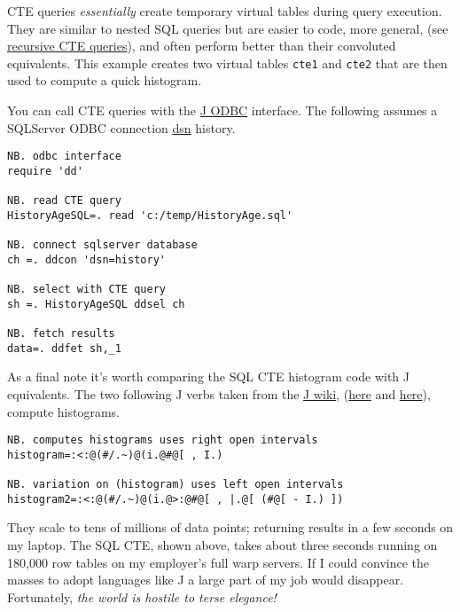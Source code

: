 CTE queries \emph{essentially} create temporary virtual tables during
query execution. They are similar to nested SQL queries but are easier
to code, more general, (see
\href{http://msdn.microsoft.com/en-us/library/ms186243.aspx}{recursive
CTE queries}), and often perform better than their convoluted
equivalents. This example creates two virtual tables \texttt{cte1} and \texttt{cte2} that
are then used to compute a quick histogram.

You can call CTE queries with the
\href{http://www.jsoftware.com/jwiki/ODBC}{J ODBC} interface. The
following assumes a SQLServer ODBC connection
\href{http://www.geeksengine.com/article/mysql-odbc.html}{dsn} history.

\begin{tcolorbox}[breakable, size=fbox, boxrule=1pt, pad at break*=1mm,colback=cellbackground, colframe=cellborder]
\begin{lstlisting}[language=jdoc, frame=single,framerule=0pt,label=lst:scr1795X1]
NB. odbc interface
require 'dd'

NB. read CTE query
HistoryAgeSQL=. read 'c:/temp/HistoryAge.sql'

NB. connect sqlserver database
ch =. ddcon 'dsn=history'

NB. select with CTE query
sh =. HistoryAgeSQL ddsel ch

NB. fetch results
data=. ddfet sh,_1
\end{lstlisting}
\end{tcolorbox}

As a final note it's worth comparing the SQL CTE histogram code with J
equivalents. The two following J verbs taken from the
\href{http://www.jsoftware.com/jwiki/FrontPage}{J wiki},
(\href{http://www.jsoftware.com/jwiki/Essays/Histogram}{here} and
\href{http://www.jsoftware.com/jwiki/BrianSchott/Histogram}{here}),
compute histograms.

\begin{tcolorbox}[breakable, size=fbox, boxrule=1pt, pad at break*=1mm,colback=cellbackground, colframe=cellborder]
\begin{lstlisting}[language=jdoc, frame=single,framerule=0pt,label=lst:scr1795X2]
NB. computes histograms uses right open intervals
histogram=:<:@(#/.~)@(i.@#@[ , I.)

NB. variation on (histogram) uses left open intervals
histogram2=:<:@(#/.~)@(i.@>:@#@[ , |.@[ (#@[ - I.) ])
\end{lstlisting}
\end{tcolorbox}

They scale to tens of millions of data points; returning results in a
few seconds on my laptop. The SQL CTE, shown above, takes about three
seconds running on 180,000 row tables on my employer's full warp
servers. If I could convince the masses to adopt languages like J a
large part of my job would disappear. Fortunately, \emph{the world is
hostile to terse elegance!}



%